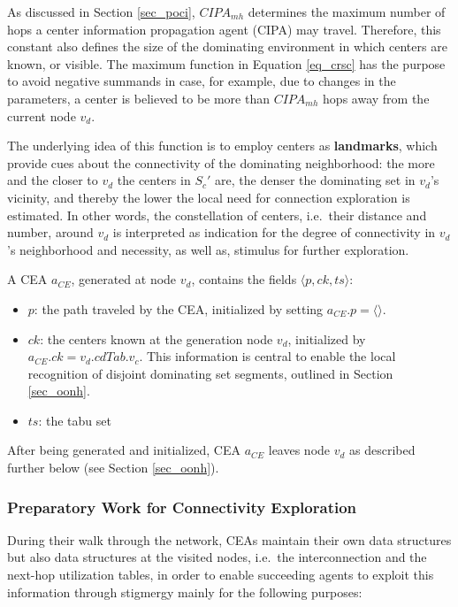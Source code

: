 As discussed in Section \ref{sec_poci}, $CIPA_{mh}$ determines the maximum number of hops a center information propagation agent (CIPA) may travel. Therefore, this constant also defines the size of the dominating environment in which centers are known, or visible. The maximum function in Equation \ref{eq_crsc} has the purpose to avoid negative summands in case, for example, due to changes in the parameters, a center is believed to be more than $CIPA_{mh}$ hops away from the current node $v_d$.

The underlying idea of this function is to employ centers as \textbf{landmarks}, which provide cues about the connectivity of the dominating neighborhood: the more and the closer to $v_d$ the centers in $S_c'$ are, the denser the dominating set in $v_d$'s vicinity, and thereby the lower the local need for connection exploration is estimated. In other words, the constellation of centers, i.e.\ their distance and number, around $v_d$ is interpreted as indication for the degree of connectivity in $v_d$'s neighborhood and necessity, as well as, stimulus for further exploration. 



A CEA $a_{CE}$, generated at node $v_d$, contains the fields $\langle p,ck,ts \rangle$:

\begin{itemize}
		\item $p$: the path traveled by the CEA, initialized by setting $a_{CE}.p=\langle \rangle$. 
		
		\item $ck$: the centers known at the generation node $v_d$, initialized by $a_{CE}.ck=v_d.cdTab.v_c$. This information is central to enable the local recognition of disjoint dominating set segments, outlined in Section \ref{sec_oonh}.
		
		\item $ts$: the tabu set
\end{itemize}

After being generated and initialized, CEA $a_{CE}$ leaves node $v_d$ as described further below (see Section \ref{sec_oonh}).

\subsubsection{Preparatory Work for Connectivity Exploration}\label{sec_pwfc} During their walk through the network, CEAs maintain their own data structures but also data structures at the visited nodes, i.e.\ the interconnection and the next-hop utilization tables, in order to enable succeeding agents to exploit this information through stigmergy mainly for the following purposes:

